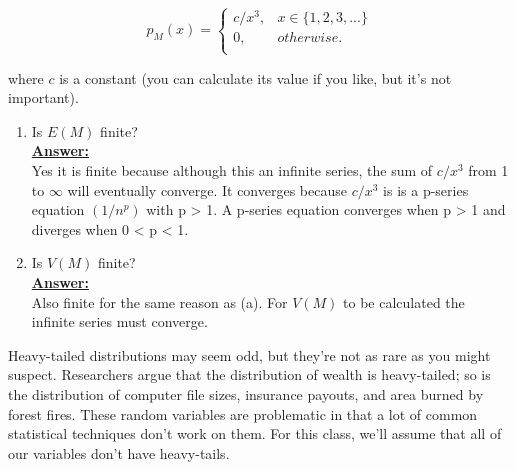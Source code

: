 \documentclass[12pt,a4paper]{article}
\numberwithin{equation}{subsection}
\begin{document}
\begin{enumerate}
$$p_M(x) = \begin{cases}
c/x^3, &x \in \{1,2,3,...\}\\
0, &otherwise.\\
\end{cases}
$$

where $c$ is a constant (you can calculate its value if you like, but it's not important).

\begin{enumerate}
\item Is $E(M)$ finite?
\\
\textbf{\underline{Answer:}}
\\
Yes it is finite because although this an infinite series, the sum of $c/x^3$ from 1 to $\infty$ will eventually converge.  It converges because $c/x^3$ is is a p-series equation $(1/n^p)$ with p > 1.  A p-series equation converges when p > 1 and diverges when 0 < p < 1.

\item Is $V(M)$ finite?
\\
\textbf{\underline{Answer:}}
\\
Also finite for the same reason as (a). For $V(M)$ to be calculated the infinite series must converge.

\end{enumerate}

Heavy-tailed distributions may seem odd, but they're not as rare as you might suspect.  Researchers argue that the distribution of wealth is heavy-tailed; so is the distribution of computer file sizes, insurance payouts, and area burned by forest fires.  These random variables are problematic in that a lot of common statistical techniques don't work on them.  For this class, we'll assume that all of our variables don't have heavy-tails.

\end{enumerate}
\end{document}
